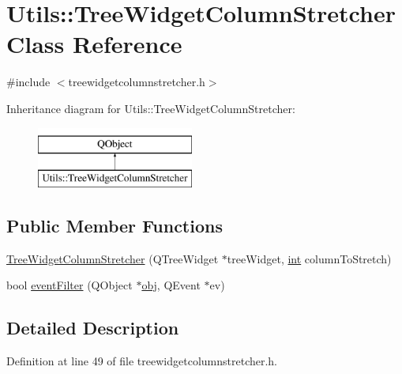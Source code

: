\hypertarget{class_utils_1_1_tree_widget_column_stretcher}{\section{Utils\-:\-:Tree\-Widget\-Column\-Stretcher Class Reference}
\label{class_utils_1_1_tree_widget_column_stretcher}
}


{\ttfamily \#include $<$treewidgetcolumnstretcher.\-h$>$}

Inheritance diagram for Utils\-:\-:Tree\-Widget\-Column\-Stretcher\-:\begin{figure}[H]
\begin{center}
\leavevmode
\includegraphics[height=2.000000cm]{class_utils_1_1_tree_widget_column_stretcher}
\end{center}
\end{figure}
\subsection*{Public Member Functions}
\begin{DoxyCompactItemize}
\item 
\hyperlink{class_utils_1_1_tree_widget_column_stretcher_a8be2578da3c18316f9c1158176d9814e}{Tree\-Widget\-Column\-Stretcher} (Q\-Tree\-Widget $\ast$tree\-Widget, \hyperlink{ioapi_8h_a787fa3cf048117ba7123753c1e74fcd6}{int} column\-To\-Stretch)
\item 
bool \hyperlink{class_utils_1_1_tree_widget_column_stretcher_a947be1428599b1072686b3081457ddba}{event\-Filter} (Q\-Object $\ast$\hyperlink{glext_8h_a0c0d4701a6c89f4f7f0640715d27ab26}{obj}, Q\-Event $\ast$ev)
\end{DoxyCompactItemize}


\subsection{Detailed Description}


Definition at line 49 of file treewidgetcolumnstretcher.\-h.




